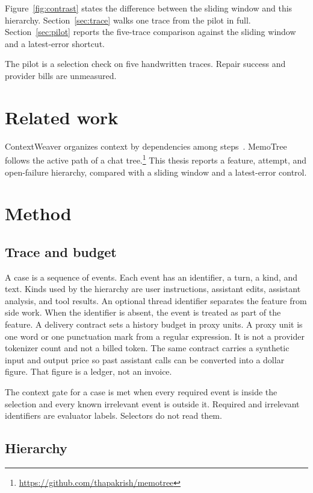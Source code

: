 \documentclass[11pt]{article}
\begin{document}
Figure~\ref{fig:contrast} states the difference between the sliding window and this hierarchy.
Section~\ref{sec:trace} walks one trace from the pilot in full.
Section~\ref{sec:pilot} reports the five-trace comparison against the sliding window and a latest-error shortcut.

The pilot is a selection check on five handwritten traces.
Repair success and provider bills are unmeasured.

\section{Related work}

ContextWeaver organizes context by dependencies among steps~\cite{wu2026contextweaver}.
MemoTree follows the active path of a chat tree.\footnote{\url{https://github.com/thapakrish/memotree}}
This thesis reports a feature, attempt, and open-failure hierarchy, compared with a sliding window and a latest-error control.

\section{Method}
\label{sec:method}

\subsection{Trace and budget}

A case is a sequence of events.
Each event has an identifier, a turn, a kind, and text.
Kinds used by the hierarchy are user instructions, assistant edits, assistant analysis, and tool results.
An optional thread identifier separates the feature from side work.
When the identifier is absent, the event is treated as part of the feature.
A delivery contract sets a history budget in proxy units.
A proxy unit is one word or one punctuation mark from a regular expression.
It is not a provider tokenizer count and not a billed token.
The same contract carries a synthetic input and output price so past assistant calls can be converted into a dollar figure.
That figure is a ledger, not an invoice.

The context gate for a case is met when every required event is inside the selection and every known irrelevant event is outside it.
Required and irrelevant identifiers are evaluator labels.
Selectors do not read them.

\subsection{Hierarchy}
\end{document}
